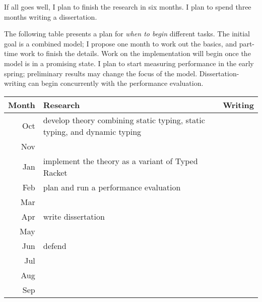 If all goes well, I plan to finish the research in six months.
I plan to spend three months writing a dissertation.

The following table presents a plan for \emph{when to begin}\/ different tasks.
The initial goal is a combined model; I propose one month to work out the
 basics, and part-time work to finish the details.
Work on the implementation will begin once the model is in a promising state.
I plan to start measuring performance in the early spring;
 preliminary results may change the focus of the model.
Dissertation-writing can begin concurrently with the performance
 evaluation.

\begin{tabular}{rll}
  Month & Research & Writing \\\hline
  Oct   & develop theory combining \tdeep{} static typing, \tshallow{} static typing, and dynamic typing
  \\
  Nov   &
  \\
  Jan   & implement the theory as a variant of Typed Racket
  \\
  Feb   & plan and run a performance evaluation
  \\
  Mar   &
  \\
  Apr   & write dissertation
  \\
  May   &
  \\
  Jun   & defend
  \\
  Jul   &
  \\
  Aug   &
  \\
  Sep   &
\end{tabular}
